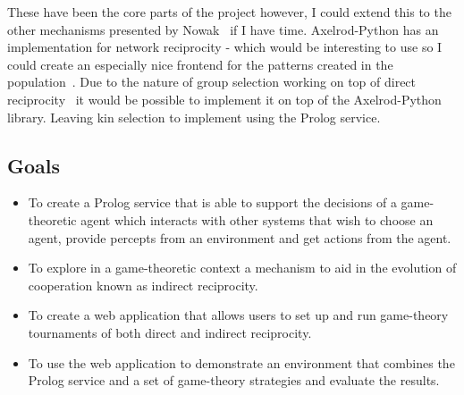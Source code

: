 \documentclass{article}
\begin{document}
These have been the core parts of the project however, I could extend this to the other mechanisms presented by Nowak~\cite{five_rules_coop} if I have time. Axelrod-Python has an implementation for network reciprocity - which would be interesting to use so I could create an especially nice frontend for the patterns created in the population~\cite{spatial}. Due to the nature of group selection working on top of direct reciprocity~\cite{multilevel_nowak} it would be possible to implement it on top of the Axelrod-Python library. Leaving kin selection to implement using the Prolog service.

\subsection*{Goals}
\begin{itemize}
\item To create a Prolog service that is able to support the decisions of a game-theoretic agent which interacts with other systems that wish to choose an agent, provide percepts from an environment and get actions from the agent.
\item To explore in a game-theoretic context a mechanism to aid in the evolution of cooperation known as indirect reciprocity.
\item To create a web application that allows users to set up and run game-theory tournaments of both direct and indirect reciprocity.
\item To use the web application to demonstrate an environment that combines the Prolog service and a set of game-theory strategies and evaluate the results.
\end{itemize}
\end{document}
